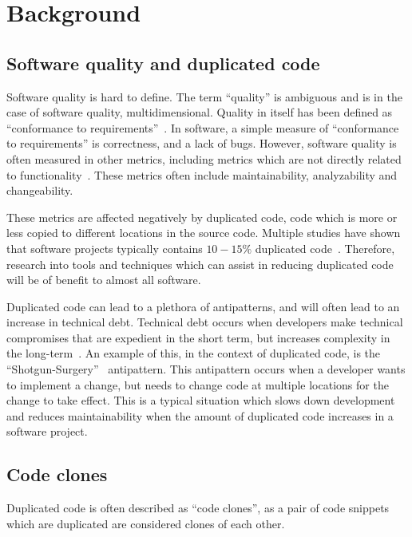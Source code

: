 \chapter{Background}


\section{Software quality and duplicated code}

Software quality is hard to define. The term ``quality'' is ambiguous and is in the case
of software quality, multidimensional. Quality in itself has been defined as ``conformance
to requirements''~\cite[8]{crosby1980quality}. In software, a simple measure of
``conformance to requirements'' is correctness, and a lack of bugs. However, software
quality is often measured in other metrics, including metrics which are not directly
related to functionality~\cite[29]{MetricsAndModelsInSoftwareQuality}. These metrics
often include maintainability, analyzability and changeability.

These metrics are affected negatively by duplicated code, code which is more or less
copied to different locations in the source code. Multiple studies have shown that
software projects typically contains $10-15\%$ duplicated code~\cite{CloningByAccident}.
Therefore, research into tools and techniques which can assist in reducing duplicated code
will be of benefit to almost all software.

Duplicated code can lead to a plethora of antipatterns, and will often lead to an increase
in technical debt. Technical debt occurs when developers make technical compromises that
are expedient in the short term, but increases complexity in the
long-term~\cite[111]{TechnicalDebt}. An example of this, in the context of duplicated
code, is the ``Shotgun-Surgery''~\cite[66]{fowlerrefactoring} antipattern. This
antipattern occurs when a developer wants to implement a change, but needs to change code
at multiple locations for the change to take effect. This is a typical situation which
slows down development and reduces maintainability when the amount of duplicated code
increases in a software project.

\section{Code clones}

Duplicated code is often described as ``code clones'', as a pair of code snippets which
are duplicated are considered clones of each other.


